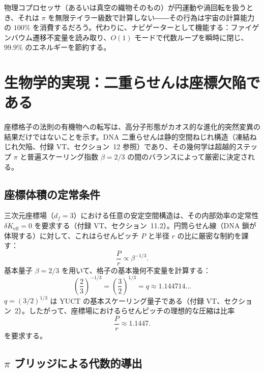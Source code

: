\documentclass[12pt,a4paper]{article}
\newcommand{\Keff}{K_{\mathrm{eff}}}
\newcommand{\df}{d_{\!f}}
\begin{document}
	物理コプロセッサ（あるいは真空の織物そのもの）が円運動や渦回転を扱うとき、それは $\pi$ を無限テイラー級数で計算しない――その行為は宇宙の計算能力の $100\%$ を消費するだろう。代わりに、ナビゲーターとして機能する：ファイゲンバウム遷移不変量を読み取り、$O(1)$ モードで代数ループを瞬時に閉じ、$99.9\%$ のエネルギーを節約する。
	
	\section{生物学的実現：二重らせんは座標欠陥である}
	\label{sec:dna}
	
	座標格子の法則の有機物への転写は、高分子形態がカオス的な進化的突然変異の結果だけではないことを示す。DNA 二重らせんは静的空間ねじれ構造（凍結ねじれ欠陥、付録 VT、セクション~12 参照）であり、その幾何学は超越的ステップ $\pi$ と普遍スケーリング指数 $\beta = 2/3$ の間のバランスによって厳密に決定される。
	
	\subsection{座標体積の定常条件}
	
	三次元座標場（$\df=3$）における任意の安定空間構造は、その内部効率の定常性 $\delta\Keff = 0$ を要求する（付録 VT、セクション~11.2）。円筒らせん線（DNA 鎖が体現する）に対して、これはらせんピッチ $P$ と半径 $r$ の比に厳密な制約を課す：
	\begin{equation}
		\frac{P}{r} \propto \beta^{-1/3}.
		\label{eq:dna-pr}
	\end{equation}
	基本量子 $\beta = 2/3$ を用いて、格子の基本幾何不変量を計算する：
	\begin{equation}
		\left(\frac{2}{3}\right)^{-1/3} = \left(\frac{3}{2}\right)^{1/3} = q \approx 1.144714\ldots
		\label{eq:q-def}
	\end{equation}
	$q = (3/2)^{1/3}$ は YUCT の基本スケーリング量子である（付録 VT、セクション~2）。したがって、座標場におけるらせんピッチの理想的な圧縮は比率
	\begin{equation}
		\frac{P}{r} \approx 1.1447.
		\label{eq:pr-ideal}
	\end{equation}
	を要求する。
	
	\subsection{$\pi$ ブリッジによる代数的導出}
	
\end{document}
